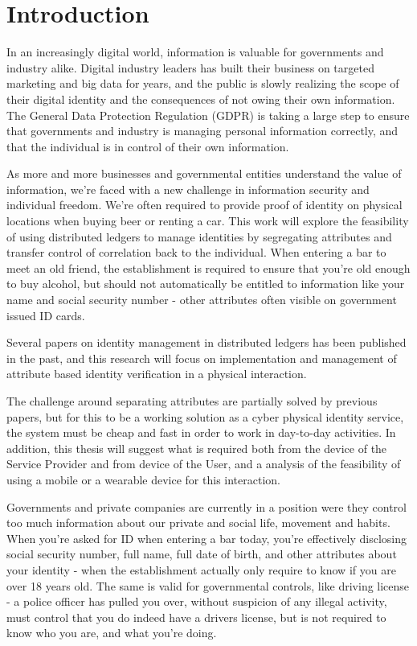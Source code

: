 \chapter{Introduction}
\label{chap:introduction}
In an increasingly digital world, information is valuable for governments and industry alike. Digital industry leaders has built their business on targeted marketing and big data for years, and the public is slowly realizing the scope of their digital identity and the consequences of not owing their own information. The General Data Protection Regulation (GDPR) is taking a large step to ensure that governments and industry is managing personal information correctly, and that the individual is in control of their own information. 

As more and more businesses and governmental entities understand the value of information, we're faced with a new challenge in information security and individual freedom. We're often required to provide proof of identity on physical locations when buying beer or renting a car. This work will explore the feasibility of using distributed ledgers to manage identities by segregating attributes and transfer control of correlation back to the individual. When entering a bar to meet an old friend, the establishment is required to ensure that you're old enough to buy alcohol, but should not automatically be entitled to information like your name and social security number - other attributes often visible on government issued ID cards. 

Several papers on identity management in distributed ledgers has been published in the past, and this research will focus on implementation and management of attribute based identity verification in a physical interaction. 

The challenge around separating attributes are partially solved by previous papers, but for this to be a working solution as a cyber physical identity service, the system must be cheap and fast in order to work in day-to-day activities. In addition, this thesis will suggest what is required both from the device of the Service Provider and from device of the User, and a analysis of the feasibility of using a mobile or a wearable device for this interaction.

Governments and private companies are currently in a position were they control too much information about our private and social life, movement and habits. When you're asked for ID when entering a bar today, you're effectively disclosing social security number, full name, full date of birth, and other attributes about your identity - when the establishment actually only require to know if you are over 18 years old. The same is valid for governmental controls, like driving license - a police officer has pulled you over, without suspicion of any illegal activity, must control that you do indeed have a drivers license, but is not required to know who you are, and what you're doing. 


